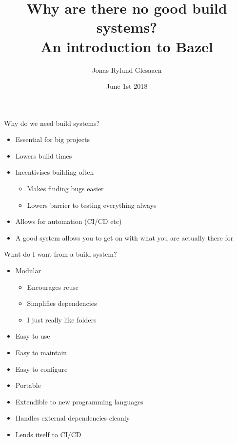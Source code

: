 \documentclass[11pt]{beamer}
\author{Jonas Rylund Glesaaen}
\title[%
Why are there no good build systems? An introduction to Bazel]{%
Why are there no good build systems? \\ An introduction to Bazel}
\date{June 1st 2018}
\institute{SA2C Tech Chat}
\begin{document}
\maketitle

\begin{frame}{Why do we need build systems?}

  \begin{itemize} \setlength\itemsep{1em}
    \item Essential for big projects
    \item Lowers build times
    \item Incentivises building often
    \begin{itemize}
      \item Makes finding bugs easier
      \item Lowers barrier to testing everything always
    \end{itemize}
  \item Allows for automation (CI/CD etc)
  \item A good system allows you to get on with what you are actually there for
  \end{itemize}

\end{frame}

\begin{frame}{What do I want from a build system?}

  \begin{itemize}
    \item Modular
      \begin{itemize}
        \item Encourages reuse
        \item Simplifies dependencies
        \item I just really like folders
      \end{itemize}
    \item Easy to use
    \item Easy to maintain
    \item Easy to configure
    \item Portable
    \item Extendible to new programming languages
    \item Handles external dependencies cleanly
    \item Lends itself to CI/CD
  \end{itemize}

\end{frame}
\end{document}
